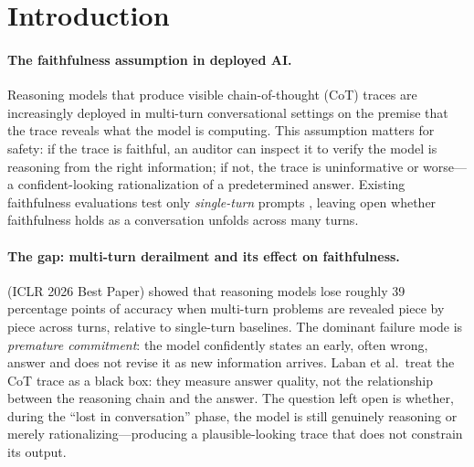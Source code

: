 \documentclass{article}
\begin{document}
\section{Introduction}
\label{sec:intro}

\paragraph{The faithfulness assumption in deployed AI.}
Reasoning models that produce visible chain-of-thought (CoT) traces
are increasingly deployed in multi-turn conversational settings
on the premise that the trace reveals what the model is computing.
This assumption matters for safety: if the trace is faithful,
an auditor can inspect it to verify the model is reasoning from
the right information; if not, the trace is uninformative or
worse---a confident-looking rationalization of a predetermined
answer.
Existing faithfulness evaluations test only \emph{single-turn}
prompts \citep{lanham2023, turpin2023, arcuschin2025},
leaving open whether faithfulness holds as a conversation unfolds
across many turns.

\paragraph{The gap: multi-turn derailment and its effect on faithfulness.}
\citet{laban2025} (ICLR 2026 Best Paper) showed that reasoning models
lose roughly 39 percentage points of accuracy when multi-turn problems
are revealed piece by piece across turns, relative to single-turn baselines.
The dominant failure mode is \emph{premature commitment}: the model
confidently states an early, often wrong, answer and does not revise
it as new information arrives.
Laban et al.\ treat the CoT trace as a black box: they measure
answer quality, not the relationship between the reasoning chain
and the answer.
The question left open is whether, during the ``lost in
conversation'' phase, the model is still genuinely reasoning or
merely rationalizing---producing a plausible-looking trace that
does not constrain its output.
\end{document}
